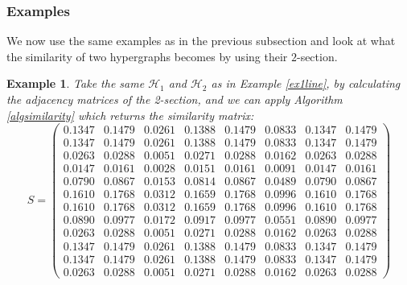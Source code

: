 \documentclass[a4paper,11pt]{report}
\newtheorem{example}[theorem]{Example}
\newcommand{\hgrafeen}{\mathcal{H}}
\begin{document}
  
  
\subsubsection{Examples}
We now use the same examples as in the previous subsection and look at what the 
similarity of two hypergraphs becomes by using their $2$-section.
\begin{example}\label{ex2sec1}
  Take the same $\hgrafeen_1$ and $\hgrafeen_2$ as in Example \ref{ex1line}, 
by calculating the adjacency matrices of the 2-section,
   and we can apply Algorithm \ref{algsimilarity}  which returns the similarity 
   matrix:
   $$ S = \begin{pmatrix}
0.1347&0.1479&0.0261&0.1388&0.1479&0.0833&0.1347&0.1479\\
0.1347&0.1479&0.0261&0.1388&0.1479&0.0833&0.1347&0.1479\\
0.0263&0.0288&0.0051&0.0271&0.0288&0.0162&0.0263&0.0288\\
0.0147&0.0161&0.0028&0.0151&0.0161&0.0091&0.0147&0.0161\\
0.0790&0.0867&0.0153&0.0814&0.0867&0.0489&0.0790&0.0867\\
0.1610&0.1768&0.0312&0.1659&0.1768&0.0996&0.1610&0.1768\\
0.1610&0.1768&0.0312&0.1659&0.1768&0.0996&0.1610&0.1768\\
0.0890&0.0977&0.0172&0.0917&0.0977&0.0551&0.0890&0.0977\\
0.0263&0.0288&0.0051&0.0271&0.0288&0.0162&0.0263&0.0288\\
0.1347&0.1479&0.0261&0.1388&0.1479&0.0833&0.1347&0.1479\\
0.1347&0.1479&0.0261&0.1388&0.1479&0.0833&0.1347&0.1479\\
0.0263&0.0288&0.0051&0.0271&0.0288&0.0162&0.0263&0.0288
\end{pmatrix} $$


 \end{example}
\end{document}

